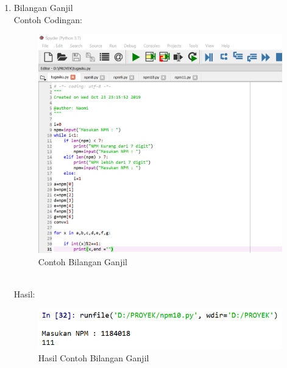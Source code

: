 \begin{enumerate}
    \newpage
    \item Bilangan Ganjil \\
    Contoh Codingan:
    \begin{figure}[!htbp]
    \centering
    \includegraphics[width=13cm]{gambar2/ganjil.png}
    \caption{Contoh Bilangan Ganjil}
    \end{figure}\\
    Hasil:
    \begin{figure}[!htbp]
    \centering
    \includegraphics[width=14cm]{gambar2/ganjil1.png}
    \caption{Hasil Contoh Bilangan Ganjil}
    \end{figure}
    

\end{enumerate}
